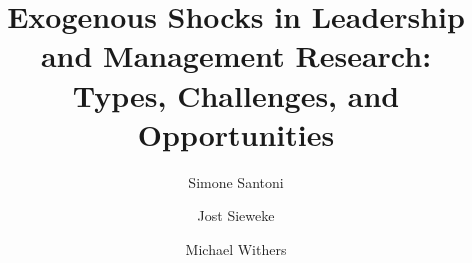 \usepackage{array}
\usepackage{booktabs}
\usepackage{dcolumn}
\usepackage{pgf}
\usepackage{lmodern}
\usepackage{import}
\usepackage{pgfplots}
\pgfplotsset{compat=1.16}
\usepackage[utf8]{inputenc}
\usepackage{tikz}
\usepackage{threeparttable}
\usepackage{graphicx}
\usepackage{rotating}
\usepackage{caption}
\captionsetup[table]{labelfont=sc, labelsep=newline}
\renewcommand{\figurename}{\itshape Fig.}
\renewcommand{\thetable}{\Roman{table}}
\usepackage{csquotes}
\usepackage{pdflscape}

\usepackage{amssymb}

\usepackage[toc, page]{appendix}





\title{Exogenous Shocks in Leadership and Management Research:\\
Types, Challenges, and Opportunities\vspace{2em}}

\author[$\bullet$]{Simone Santoni}
\author[$\star$]{Jost Sieweke}
\author[$\circ$]{Michael Withers}

\renewcommand\Authands{ and }
\renewcommand\Affilfont{\normalsize}

